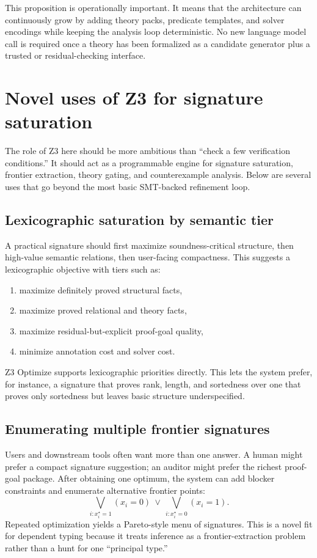 \documentclass[11pt]{article}
\newcommand{\Zthree}{\textsc{Z3}}
\theoremstyle{definition}
\theoremstyle{plain}
\begin{document}
This proposition is operationally important. It means that the architecture can
continuously grow by adding theory packs, predicate templates, and solver
encodings while keeping the analysis loop deterministic. No new language model
call is required once a theory has been formalized as a candidate generator plus
a trusted or residual-checking interface.

\section{Novel uses of \Zthree{} for signature saturation}

The role of \Zthree{} here should be more ambitious than ``check a few
verification conditions.'' It should act as a programmable engine for signature
saturation, frontier extraction, theory gating, and counterexample analysis.
Below are several uses that go beyond the most basic SMT-backed refinement loop.

\subsection{Lexicographic saturation by semantic tier}
A practical signature should first maximize soundness-critical structure, then
high-value semantic relations, then user-facing compactness. This suggests a
lexicographic objective with tiers such as:
\begin{enumerate}[label=\arabic*.]
  \item maximize definitely proved structural facts,
  \item maximize proved relational and theory facts,
  \item maximize residual-but-explicit proof-goal quality,
  \item minimize annotation cost and solver cost.
\end{enumerate}
\Zthree{} Optimize supports lexicographic priorities directly. This lets the
system prefer, for instance, a signature that proves rank, length, and sortedness
over one that proves only sortedness but leaves basic structure underspecified.

\subsection{Enumerating multiple frontier signatures}
Users and downstream tools often want more than one answer. A human might prefer
a compact signature suggestion; an auditor might prefer the richest proof-goal
package. After obtaining one optimum, the system can add blocker constraints and
enumerate alternative frontier points:
\[
\bigvee_{i : x_i^\star = 1} (x_i = 0)
\ \vee \ 
\bigvee_{i : x_i^\star = 0} (x_i = 1).
\]
Repeated optimization yields a Pareto-style menu of signatures. This is a novel
fit for dependent typing because it treats inference as a frontier-extraction
problem rather than a hunt for one ``principal type.''
\end{document}
